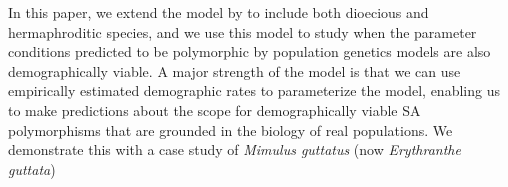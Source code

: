 \documentclass[11pt]{article}
\begin{document}
In this paper, we extend the model by \cite{deVriesCaswell2019b} to include both dioecious and hermaphroditic species, and we use this model to study when the parameter conditions predicted to be polymorphic by population genetics models are also demographically viable. A major strength of the model is that we can use empirically estimated demographic rates to parameterize the model, enabling us to make predictions about the scope for demographically viable SA polymorphisms that are grounded in the biology of real populations. We demonstrate this with a case study of {\itshape Mimulus guttatus} (now {\itshape Erythranthe guttata})








\end{document}
